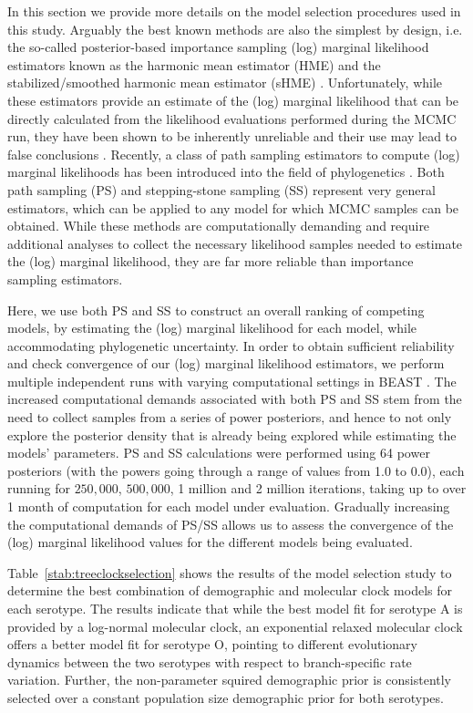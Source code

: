 \documentclass[a4paper,10pt]{article}
\begin{document}
In this section we provide more details on the model selection procedures used in this study.
Arguably the best known methods are also the simplest by design, i.e. the so-called posterior-based importance sampling (log) marginal likelihood estimators known as the harmonic mean estimator (HME) \cite{Newton} and the stabilized/smoothed harmonic mean estimator (sHME) \cite{M-suchard2005models}.
Unfortunately, while these estimators provide an estimate of the (log) marginal likelihood that can be directly calculated from the likelihood evaluations performed during the MCMC run, they have been shown to be inherently unreliable and their use may lead to false conclusions \cite{M-LartillotPhilippe, M-Xie, M-Baele2012, M-Baele2013a, M-Baele2013b, M-Baele2013c}.
Recently, a class of path sampling estimators to compute (log) marginal likelihoods has been introduced into the field of phylogenetics \cite{M-LartillotPhilippe, M-Xie}.
Both path sampling (PS) and stepping-stone sampling (SS) represent very general estimators, which can be applied to any model for which MCMC samples can be obtained.
While these methods are computationally demanding and require additional analyses to collect the necessary likelihood samples needed to estimate the (log) marginal likelihood, they are far more reliable than importance sampling estimators.

Here, we use both PS and SS to construct an overall ranking of competing models, by estimating the (log) marginal likelihood for each model, while accommodating phylogenetic uncertainty.
In order to obtain sufficient reliability and check convergence of our (log) marginal likelihood estimators, we perform multiple independent runs with varying computational settings in BEAST \cite{M-beast2012}.
The increased computational demands associated with both PS and SS stem from the need to collect samples from a series of power posteriors, and hence to not only explore the posterior density that is already being explored while estimating the models' parameters.
PS and SS calculations were performed using 64 power posteriors (with the powers going through a range of values from 1.0 to 0.0), each running for $250,000$, $500,000$, 1 million and 2 million iterations, taking up to over 1 month of computation for each model under evaluation.
Gradually increasing the computational demands of PS/SS allows us to assess the convergence of the (log) marginal likelihood values for the different models being evaluated.

Table~\ref{stab:treeclockselection} shows the results of the model selection study to determine the best combination of demographic and molecular clock models for each serotype.
The results indicate that while the best model fit for serotype A is provided by a log-normal molecular clock, an exponential relaxed molecular clock offers a better model fit for serotype O, pointing to different evolutionary dynamics between the two serotypes with respect to branch-specific rate variation. 
Further, the non-parameter squired demographic prior is consistently selected over a constant population size demographic prior for both serotypes. 
\end{document}
